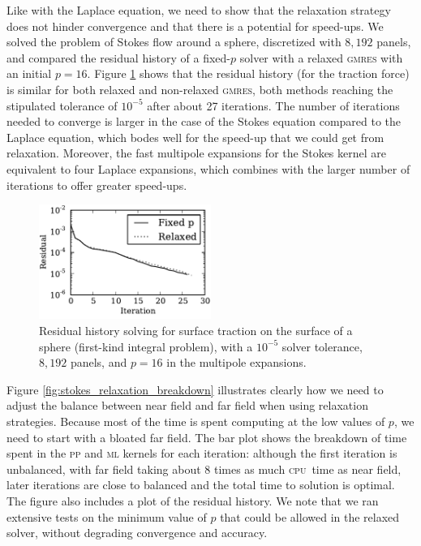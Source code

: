 \documentclass[final,leqno,]{siamltex1213}
\newcommand{\cpu}{\textsc{cpu}}
\newcommand{\mtol}{\textsc{m}\texttwooldstyle\textsc{l}\xspace} %
\newcommand{\ptop}{\textsc{p}\texttwooldstyle\textsc{p}\xspace} %
\newcommand{\gmres}{\textsc{gmres}\xspace}
\begin{document}
Like with the Laplace equation, we need to show that the relaxation strategy does not hinder convergence and that there is a potential for speed-ups. We solved the problem of Stokes flow around a sphere, discretized with $8,192$ panels, and compared the residual history of a fixed-$p$ solver with a relaxed \gmres with an initial $p=16$. Figure \ref{fig:stokes_residual_history_relaxed} shows that the residual history (for the traction force) is similar for both relaxed and non-relaxed \gmres, both methods reaching the stipulated tolerance of $10^{-5}$ after about 27 iterations.
The number of iterations needed to converge is larger in the case of the Stokes equation compared to the Laplace equation, which bodes well for the speed-up that we could get from relaxation. Moreover, the fast multipole expansions for the Stokes kernel are equivalent to four Laplace expansions, which combines with the larger number of iterations to offer greater speed-ups.


\begin{figure}[h]
\begin{center}
	\includegraphics[natwidth=3in,natheight=2in,width=0.5\textwidth]{StokesResidualHistory.pdf}
	\caption{Residual history solving for surface traction on the surface of a sphere (first-kind integral problem), with a $10^{-5}$ solver tolerance, $8,192$ panels, and $p=16$ in the multipole expansions.}
	\label{fig:stokes_residual_history_relaxed}
\end{center}
\end{figure}

Figure \ref{fig:stokes_relaxation_breakdown} illustrates clearly how we need to adjust the balance between near field and far field when using relaxation strategies. Because most of the time is spent computing at the low values of $p$, we need to start with a bloated far field. The bar plot shows the breakdown of time spent in the {\ptop} and {\mtol} kernels for each iteration: although the first iteration is unbalanced, with far field taking about 8 times as much \cpu\ time as near field, later iterations are close to balanced and the total time to solution is optimal. 
The figure also includes a plot of the residual history. We note that we ran extensive tests on the minimum value of $p$ that could be allowed in the relaxed solver, without degrading convergence and accuracy. 
\end{document}
